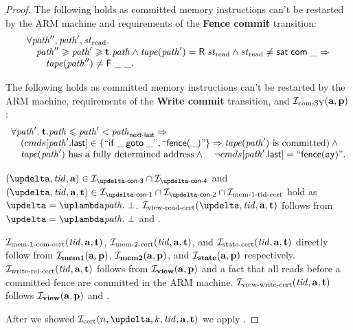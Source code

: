 \begin{proof}
  The following holds as committed memory instructions can't be restarted by the ARM machine and requirements of
  the {\sf \bf Fence commit} transition:
  \[\begin{array}{l}
    \forall \cpath'', \cpath', \Rstate. \\
    \quad \cpath'' \ge \cpath' \ge \tT.\cpath \land \tape(\cpath') = \tapeRead{\Rstate} \land
       \Rstate \not = \tapeSatisfied{\Committed}{\_} \Rightarrow \\
    \quad \quad \tape(\cpath'') \not = \tapeFence{\_}{\_}. \\
  \end{array}\]

  The following holds as committed memory instructions can't be restarted by the ARM machine, requirements of
  the {\sf \bf Write commit} transition, and $\mathcal{I}_{\textup{\rm com-SY}}(\mathbf{a}, \mathbf{p})$:
  \[\begin{array}{l}
    \forall \cpath'. \; \tT.\cpath \le \cpath' < \cpath_{\textup{\sf next-last}} \Rightarrow \\
    \quad (\Cprom[\lastInstr{\cpath'}] \in \{``\ifGotoInst{\_}{\_}", ``\fenceInst{\_}"\} \Rightarrow
             \tape(\cpath') \text{ is committed}) \land {} \\
    \quad \tape(\cpath') \text{ has a fully determined address} \land
    \quad \lnot \Cprom[\lastInstr{\cpath'}] = ``\fenceInst{\SY}". \\
  \end{array}\]

  $(\delta, \tId, \aT) \in \invDeltaDefThree \cap \invDeltaDefFour$ and
  $(\delta, \tId, \aT, \tT) \in \invDeltaDefOne \cap \invDeltaDefTwo \cap \invMemZeroCERT$
  hold as $\delta = \lambda \cpath. \; \bot$.
  $\invViewReadCERT(\delta, \tId, \aT, \tT)$ follows from $\delta = \lambda \cpath. \; \bot$ and \app{\ref{thm:invAview}}.

  
  $\mathcal{I}_{\textup{\rm mem-1-com-cert}}(\mathit{tid}, \mathbf{a}, \mathbf{t})$, $\mathcal{I}_{\textup{\rm mem-2-cert}}(\mathit{tid}, \mathbf{a}, \mathbf{t})$, and $\mathcal{I}_{\textup{\rm state-cert}}(\mathit{tid}, \mathbf{a}, \mathbf{t})$
  directly follow from $\mathcal{I}_{\rm \bf mem1}(\mathbf{a}, \mathbf{p})$, $\mathcal{I}_{\rm \bf mem2}(\mathbf{a}, \mathbf{p})$, and $\mathcal{I}_{\rm \bf state}(\mathbf{a}, \mathbf{p})$ respectively.
  $\mathcal{I}_{\textup{\rm write-rel-cert}}(\mathit{tid}, \mathbf{a}, \mathbf{t})$ follows from $\mathcal{I}_{\rm \bf view}(\mathbf{a}, \mathbf{p})$ and a fact that all reads before a committed fence are committed
  in the ARM machine. $\mathcal{I}_{\textup{\rm view-write-cert}}(\mathit{tid}, \mathbf{a}, \mathbf{t})$ follows $\mathcal{I}_{\rm \bf view}(\mathbf{a}, \mathbf{p})$ and \app{\ref{thm:invAview}}.

  After we showed $\invCert(n, \delta, k, \tId, \aT, \tT)$ we apply \app{\ref{cert-lem-three}}.
\end{proof}




